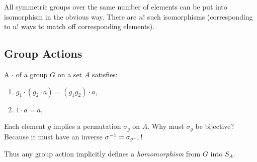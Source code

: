 \begin{remark}
  All symmetric groups over the same number of elements can be put into
  isomorphism in the obvious way. There are $n!$ such isomorphisms
  (corresponding to $n!$ ways to match off corresponding elements).
\end{remark}

\subsection{Group Actions}

\begin{definition}
  A  $\cdot$ of a group $G$ on a set $A$ satisfies:

  \begin{enumerate}
    \item $g_1 \cdot (g_2 \cdot a) = (g_1 g_2) \cdot a$,
    \item $1 \cdot a = a$.
  \end{enumerate}
\end{definition}

\begin{remark}
  Each element $g$ implies a permutation $\sigma_g$ on $A$. Why must
  $\sigma_g$ be bijective? Because it must have an inverse
  ${\sigma}^{-1} = \sigma_{{g}^{-1}}$!

  Thus any group action implicitly defines a \emph{homomorphism} from
  $G$ into $S_A$.
\end{remark}
